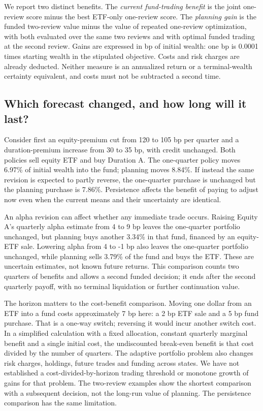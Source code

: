 \documentclass[11pt]{article}
\begin{document}
We report two distinct benefits. The \emph{current fund-trading benefit} is the joint one-review score minus the best ETF-only one-review score. The \emph{planning gain} is the funded two-review value minus the value of repeated one-review optimization, with both evaluated over the same two reviews and with optimal funded trading at the second review. Gains are expressed in bp of initial wealth: one bp is 0.0001 times starting wealth in the stipulated objective. Costs and risk charges are already deducted. Neither measure is an annualized return or a terminal-wealth certainty equivalent, and costs must not be subtracted a second time.

\subsection{Which forecast changed, and how long will it last?}\label{sec:6.2}

Consider first an equity-premium cut from 120 to 105 bp per quarter and a duration-premium increase from 30 to 35 bp, with credit unchanged. Both policies sell equity ETF and buy Duration A. The one-quarter policy moves 6.97\% of initial wealth into the fund; planning moves 8.84\%. If instead the same revision is expected to partly reverse, the one-quarter purchase is unchanged but the planning purchase is 7.86\%. Persistence affects the benefit of paying to adjust now even when the current means and their uncertainty are identical.

An alpha revision can affect whether any immediate trade occurs. Raising Equity A's quarterly alpha estimate from 4 to 9 bp leaves the one-quarter portfolio unchanged, but planning buys another 3.34\% in that fund, financed by an equity-ETF sale. Lowering alpha from 4 to -1 bp also leaves the one-quarter portfolio unchanged, while planning sells 3.79\% of the fund and buys the ETF. These are uncertain estimates, not known future returns. This comparison counts two quarters of benefits and allows a second funded decision; it ends after the second quarterly payoff, with no terminal liquidation or further continuation value.

The horizon matters to the cost-benefit comparison. Moving one dollar from an ETF into a fund costs approximately 7 bp here: a 2 bp ETF sale and a 5 bp fund purchase. That is a one-way switch; reversing it would incur another switch cost. In a simplified calculation with a fixed allocation, constant quarterly marginal benefit and a single initial cost, the undiscounted break-even benefit is that cost divided by the number of quarters. The adaptive portfolio problem also changes risk charges, holdings, future trades and funding across states. We have not established a cost-divided-by-horizon trading threshold or monotone growth of gains for that problem. The two-review examples show the shortest comparison with a subsequent decision, not the long-run value of planning. The persistence comparison has the same limitation.
\end{document}
